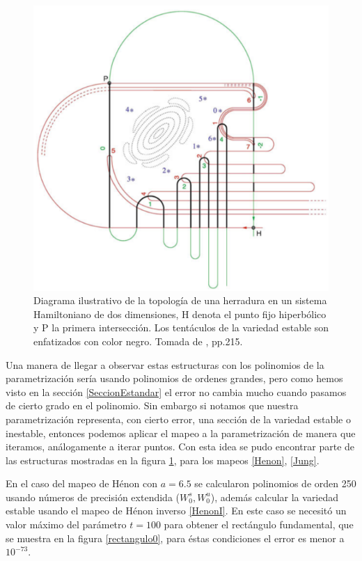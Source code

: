\begin{figure}[H]
\centering
\includegraphics[scale=0.25]{herradura}
\caption{Diagrama ilustrativo de la topología de una herradura en un sistema Hamiltoniano de dos dimensiones, H denota el punto fijo hiperbólico y P la primera intersección. Los tentáculos de la variedad estable son enfatizados con color negro. Tomada de \cite{Ying}, pp.215.}
\label{herradura}
\end{figure}

Una manera de llegar a observar estas estructuras con los polinomios de la parametrización sería usando polinomios de ordenes grandes, pero como hemos visto en la sección \ref{SeccionEstandar} el error no cambia mucho cuando pasamos de cierto grado en el polinomio. Sin embargo si notamos que nuestra parametrización representa, con cierto error, una sección de la variedad estable o inestable, entonces podemos aplicar el mapeo a la parametrización de manera que iteramos, análogamente a iterar puntos. Con esta idea se pudo encontrar parte de las estructuras mostradas en la figura \ref{herradura}, para los mapeos \eqref{Henon}, \eqref{Jung}.


En el caso del mapeo de Hénon con $a=6.5$ se calcularon polinomios de orden 250 usando números de precisión extendida ($W_{0}^{s},W_{0}^{u}$), además calcular la variedad estable usando el mapeo de Hénon inverso \eqref{HenonI}. En este caso se necesitó un valor máximo del parámetro $t=100$ para obtener el rectángulo fundamental, que se muestra en la figura \ref{rectangulo0}, para éstas condiciones el error es menor a $10^{-73}$.

